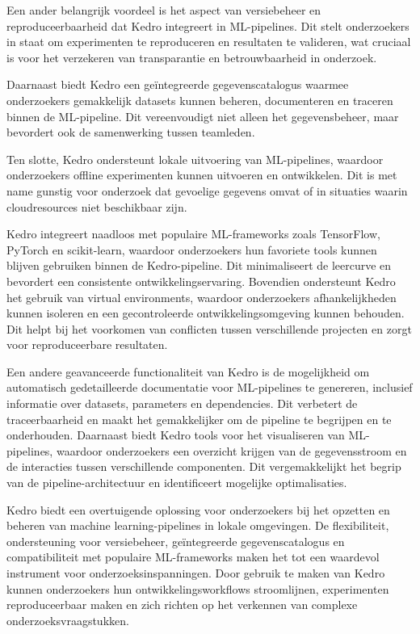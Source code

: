 Een ander belangrijk voordeel is het aspect van versiebeheer en reproduceerbaarheid dat Kedro integreert in ML-pipelines. Dit stelt onderzoekers in staat om experimenten te reproduceren en resultaten te valideren, wat cruciaal is voor het verzekeren van transparantie en betrouwbaarheid in onderzoek.

Daarnaast biedt Kedro een geïntegreerde gegevenscatalogus waarmee onderzoekers gemakkelijk datasets kunnen beheren, documenteren en traceren binnen de ML-pipeline. Dit vereenvoudigt niet alleen het gegevensbeheer, maar bevordert ook de samenwerking tussen teamleden.

Ten slotte, Kedro ondersteunt lokale uitvoering van ML-pipelines, waardoor onderzoekers offline experimenten kunnen uitvoeren en ontwikkelen. Dit is met name gunstig voor onderzoek dat gevoelige gegevens omvat of in situaties waarin cloudresources niet beschikbaar zijn.

Kedro integreert naadloos met populaire ML-frameworks zoals TensorFlow, PyTorch en scikit-learn, waardoor onderzoekers hun favoriete tools kunnen blijven gebruiken binnen de Kedro-pipeline. Dit minimaliseert de leercurve en bevordert een consistente ontwikkelingservaring. Bovendien ondersteunt Kedro het gebruik van virtual environments, waardoor onderzoekers afhankelijkheden kunnen isoleren en een gecontroleerde ontwikkelingsomgeving kunnen behouden. Dit helpt bij het voorkomen van conflicten tussen verschillende projecten en zorgt voor reproduceerbare resultaten.

Een andere geavanceerde functionaliteit van Kedro is de mogelijkheid om automatisch gedetailleerde documentatie voor ML-pipelines te genereren, inclusief informatie over datasets, parameters en dependencies. Dit verbetert de traceerbaarheid en maakt het gemakkelijker om de pipeline te begrijpen en te onderhouden. Daarnaast biedt Kedro tools voor het visualiseren van ML-pipelines, waardoor onderzoekers een overzicht krijgen van de gegevensstroom en de interacties tussen verschillende componenten. Dit vergemakkelijkt het begrip van de pipeline-architectuur en identificeert mogelijke optimalisaties.

Kedro biedt een overtuigende oplossing voor onderzoekers bij het opzetten en beheren van machine learning-pipelines in lokale omgevingen. De flexibiliteit, ondersteuning voor versiebeheer, geïntegreerde gegevenscatalogus en compatibiliteit met populaire ML-frameworks maken het tot een waardevol instrument voor onderzoeksinspanningen. Door gebruik te maken van Kedro kunnen onderzoekers hun ontwikkelingsworkflows stroomlijnen, experimenten reproduceerbaar maken en zich richten op het verkennen van complexe onderzoeksvraagstukken.

